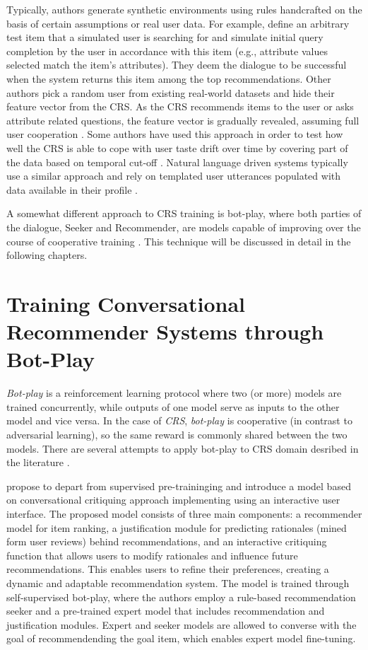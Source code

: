 Typically, authors generate synthetic environments using rules handcrafted on the basis of certain assumptions or real user data. For example, \cite{mahmood2008adapting} define an arbitrary test item that a simulated user is searching for and simulate initial query completion by the user in accordance with this item (e.g., attribute values selected match the item’s attributes). They deem the dialogue to be successful when the system returns this item among the top recommendations. Other authors pick a random user from existing real-world datasets and hide their feature vector from the CRS. As the CRS recommends items to the user or asks attribute related questions, the feature vector is gradually revealed, assuming full user cooperation \citep{zhao2013interactive, greco2017converse, vendrov2020gradient}. Some authors have used this approach in order to test how well the CRS is able to cope with user taste drift over time by covering part of the data based on temporal cut-off \citep{zhao2013interactive}. Natural language driven systems typically use a similar approach and rely on templated user utterances populated with data available in their profile \citep{greco2017converse}.

A somewhat different approach to CRS training is bot-play, where both parties of the dialogue, Seeker and Recommender, are models capable of improving over the course of cooperative training \citep{kang2019recommendation, li2022self}. This technique will be discussed in detail in the following chapters.

\section{Training Conversational Recommender Systems through Bot-Play}
\textit{Bot-play} is a reinforcement learning protocol where two (or more) models are trained concurrently, while outputs of one model serve as inputs to the other model and vice versa. In the case of \textit{CRS}, \textit{bot-play} is cooperative (in contrast to adversarial learning), so the same reward is commonly shared between the two models. There are several attempts to apply bot-play to CRS domain desribed in the literature \citep{kang2019recommendation, li2022self}.

\cite{li2022self} propose to depart from supervised pre-traininging and introduce a model based on conversational critiquing approach implementing using an interactive user interface. The proposed model consists of three main components: a recommender model for item ranking, a justification module for predicting rationales (mined form user reviews) behind recommendations, and an interactive critiquing function that allows users to modify rationales and influence future recommendations. This enables users to refine their preferences, creating a dynamic and adaptable recommendation system. The model is trained through self-supervised bot-play, where the authors employ a rule-based recommendation seeker and a pre-trained expert model that includes recommendation and justification modules. Expert and seeker models are allowed to converse with the goal of recommendending the goal item, which enables expert model fine-tuning. 

